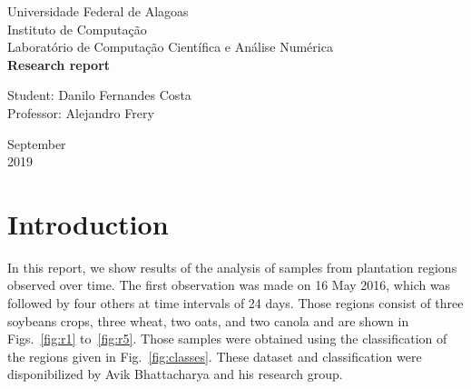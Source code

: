 \documentclass[12pt]{article}
\begin{document}

\onehalfspacing

\begin{titlepage}
\begin{center}

\Huge{Universidade Federal de Alagoas}\\
\large{Instituto de Computação}\\ 
\large{Laboratório de Computação Científica e Análise Numérica}\\ 
\vspace{220pt}
\textbf{\LARGE{Research report}}\\
\vspace{3,5cm}
\end{center}

\begin{flushleft}
\begin{tabbing}
Student: Danilo Fernandes Costa\\
Professor: Alejandro Frery\\
\end{tabbing}
\end{flushleft}
\vspace{1cm}

\begin{center}
\vspace{\fill}
September\\
2019
\end{center}
\end{titlepage}

\section{Introduction}

In this report, we show results of the analysis of samples from plantation regions observed over time.
The first observation was made on 16 May 2016, which was followed by four others at time intervals of 24 days. 
Those regions consist of three soybeans crops, three wheat, two oats, and two canola and are shown in Figs.~\ref{fig:r1} to~\ref{fig:r5}. 
Those samples were obtained using the classification of the regions given in Fig.~\ref{fig:classes}. These dataset and classification were disponibilized by Avik Bhattacharya and his research group.
\end{document}
